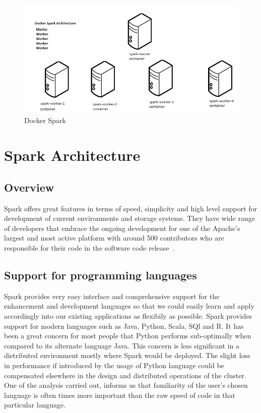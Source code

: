 \begin{figure}[!ht]
\centering\includegraphics[width=\textwidth]{images/dockerspark.png}
\caption{Docker Spark}\label{sa:archidocker}\label{s:archidocker}
\end{figure}


\section{Spark Architecture}



\subsection{Overview}
Spark offers great features in terms of speed, simplicity and high level support
 for development of current environments and storage systems. They have wide 
 range of developers that embrace the ongoing development for one of the 
 Apache's largest and most active platform with around 500 contributors who are 
 responsible for their code in the software code release~\cite{hid-sp18-410-spark-architecture}.

\subsection{Support for programming languages}
Spark provides very easy interface and comprehensive support for the enhancement
 and development languages so that we could easily learn and apply accordingly 
 into our existing applications as flexibily as possible.
Spark provides support for modern languages such as Java, Python, Scala, SQl and
 R. It has been a great concern for most people that Python performs 
 sub-optimally when compared to its alternate language Java. This concern is 
 less significant in a distributed environment mostly where Spark would be 
 deployed. The slight loss in performance if introduced by the usage of Python 
 language could be compensated elsewhere in the design and distributed 
 operations of the cluster. One of the analysis carried out, informs us that 
 familiarity of the user's chosen language is often times more important than 
 the raw speed of code in that particular language.

